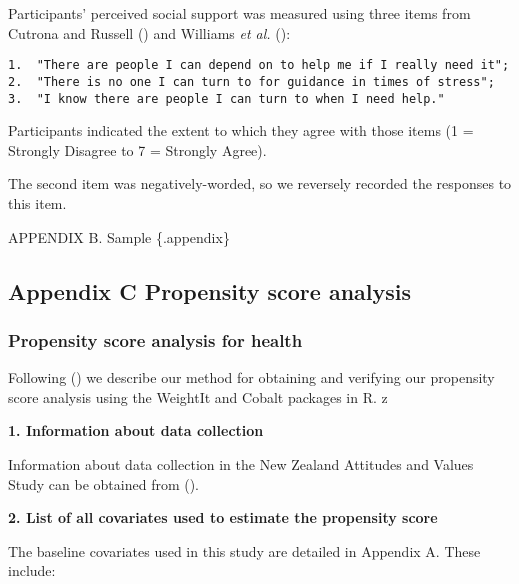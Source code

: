 \documentclass[
  singlecolumn,
  9pt]{scrartcl}
\begin{document}
Participants' perceived social support was measured using three items
from Cutrona and Russell () and Williams
\emph{et al.} ():

\begin{verbatim}
1.  "There are people I can depend on to help me if I really need it";
2.  "There is no one I can turn to for guidance in times of stress";
3.  "I know there are people I can turn to when I need help." 
\end{verbatim}

Participants indicated the extent to which they agree with those items
(1 = Strongly Disagree to 7 = Strongly Agree).

The second item was negatively-worded, so we reversely recorded the
responses to this item.

\newpage{}

APPENDIX B. Sample \{.appendix\}

\newpage{}

\subsection{Appendix C Propensity score
analysis}\label{appendix-c-propensity-score-analysis}

\subsubsection{Propensity score analysis for
health}\label{propensity-score-analysis-for-health}

Following () we
describe our method for obtaining and verifying our propensity score
analysis using the WeightIt and Cobalt packages in R. z

\textbf{1. Information about data collection}

Information about data collection in the New Zealand Attitudes and
Values Study can be obtained from ().

\textbf{2. List of all covariates used to estimate the propensity score}

The baseline covariates used in this study are detailed in Appendix A.
These include:
\end{document}
